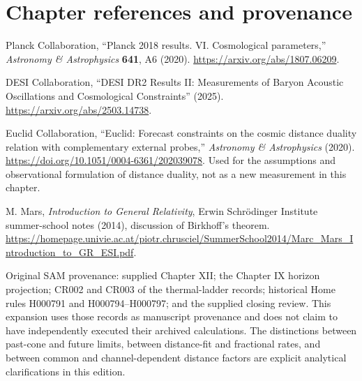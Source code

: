 \section*{Chapter references and provenance}
\begin{enumerate}[label={\textnormal{[XII.\arabic*]}}]
\item Planck Collaboration, ``Planck 2018 results. VI. Cosmological parameters,'' \emph{Astronomy \& Astrophysics} \textbf{641}, A6 (2020). \url{https://arxiv.org/abs/1807.06209}.
\item DESI Collaboration, ``DESI DR2 Results II: Measurements of Baryon Acoustic Oscillations and Cosmological Constraints'' (2025). \url{https://arxiv.org/abs/2503.14738}.
\item Euclid Collaboration, ``Euclid: Forecast constraints on the cosmic distance duality relation with complementary external probes,'' \emph{Astronomy \& Astrophysics} (2020). \url{https://doi.org/10.1051/0004-6361/202039078}. Used for the assumptions and observational formulation of distance duality, not as a new measurement in this chapter.
\item M. Mars, \emph{Introduction to General Relativity}, Erwin Schr\"odinger Institute summer-school notes (2014), discussion of Birkhoff's theorem. \url{https://homepage.univie.ac.at/piotr.chrusciel/SummerSchool2014/Marc_Mars_Introduction_to_GR_ESI.pdf}.
\end{enumerate}
Original SAM provenance: supplied Chapter XII; the Chapter IX horizon projection; CR002 and CR003 of the thermal-ladder records; historical Home rules H000791 and H000794--H000797; and the supplied closing review. This expansion uses those records as manuscript provenance and does not claim to have independently executed their archived calculations. The distinctions between past-cone and future limits, between distance-fit and fractional rates, and between common and channel-dependent distance factors are explicit analytical clarifications in this edition.
